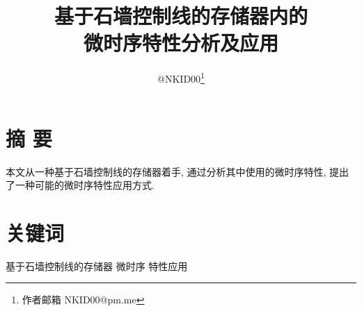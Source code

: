 \documentclass[UTF8,12pt,punct=kaiming,fontset=none]{ctexart}
\title{\vspace{-1.5cm}基于石墙控制线的存储器内的\\微时序特性分析及应用\vspace{-0.5cm}}
\author{@NKID00\footnote{作者邮箱 NKID00@pm.me}}
\date{}
\begin{document}
\maketitle
\thispagestyle{fancy} %
\vspace{-0.7cm}

\begin{flushright}
    \begin{minipage}[c]{0.91\linewidth}
        \titleformat{\section}[leftmargin]{\sffamily\small\bfseries}{}{0cm}{}
        \titlespacing{\section}{1.5cm}{1ex}{0cm}

        \section{摘 \hspace{0.105cm} 要}
        \small 本文从一种基于石墙控制线的存储器着手, 通过分析其中使用的微时序特性, 提出了一种可能的微时序特性应用方式.

        \section{关键词}
        \small 基于石墙控制线的存储器 \hspace{0.5cm} 微时序 \hspace{0.5cm} 特性应用
    \end{minipage}
\end{flushright}
\vspace{0.2cm}

\titleformat{\section}[hang]{\large\sffamily\bfseries}{\textmd{\thesection}}{0.5cm}{}
\titlespacing{\section}{0cm}{0.5ex}{0.2ex}
\titleformat{\subsection}[hang]{\normalsize\sffamily}{\textmd{\thesubsection}}{0.5cm}{}
\titlespacing{\subsection}{0cm}{0.5ex}{0.2ex}
\setcounter{section}{0}
\end{document}
